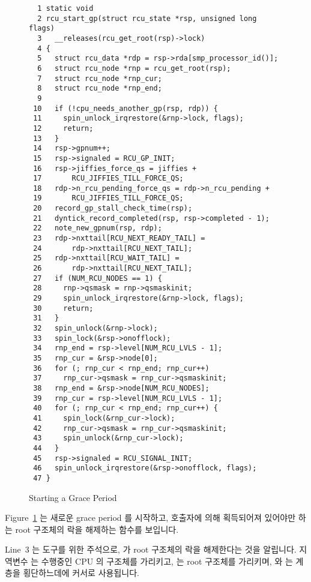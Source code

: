 \begin{figure}[tbp]
{ \scriptsize
\begin{verbatim}
  1 static void
  2 rcu_start_gp(struct rcu_state *rsp, unsigned long flags)
  3   __releases(rcu_get_root(rsp)->lock)
  4 {
  5   struct rcu_data *rdp = rsp->rda[smp_processor_id()];
  6   struct rcu_node *rnp = rcu_get_root(rsp);
  7   struct rcu_node *rnp_cur;
  8   struct rcu_node *rnp_end;
  9
 10   if (!cpu_needs_another_gp(rsp, rdp)) {
 11     spin_unlock_irqrestore(&rnp->lock, flags);
 12     return;
 13   }
 14   rsp->gpnum++;
 15   rsp->signaled = RCU_GP_INIT;
 16   rsp->jiffies_force_qs = jiffies +
 17       RCU_JIFFIES_TILL_FORCE_QS;
 18   rdp->n_rcu_pending_force_qs = rdp->n_rcu_pending +
 19       RCU_JIFFIES_TILL_FORCE_QS;
 20   record_gp_stall_check_time(rsp);
 21   dyntick_record_completed(rsp, rsp->completed - 1);
 22   note_new_gpnum(rsp, rdp);
 23   rdp->nxttail[RCU_NEXT_READY_TAIL] =
 24       rdp->nxttail[RCU_NEXT_TAIL];
 25   rdp->nxttail[RCU_WAIT_TAIL] =
 26       rdp->nxttail[RCU_NEXT_TAIL];
 27   if (NUM_RCU_NODES == 1) {
 28     rnp->qsmask = rnp->qsmaskinit;
 29     spin_unlock_irqrestore(&rnp->lock, flags);
 30     return;
 31   }
 32   spin_unlock(&rnp->lock);
 33   spin_lock(&rsp->onofflock);
 34   rnp_end = rsp->level[NUM_RCU_LVLS - 1];
 35   rnp_cur = &rsp->node[0];
 36   for (; rnp_cur < rnp_end; rnp_cur++)
 37     rnp_cur->qsmask = rnp_cur->qsmaskinit;
 38   rnp_end = &rsp->node[NUM_RCU_NODES];
 39   rnp_cur = rsp->level[NUM_RCU_LVLS - 1];
 40   for (; rnp_cur < rnp_end; rnp_cur++) {
 41     spin_lock(&rnp_cur->lock);
 42     rnp_cur->qsmask = rnp_cur->qsmaskinit;
 43     spin_unlock(&rnp_cur->lock);
 44   }
 45   rsp->signaled = RCU_SIGNAL_INIT;
 46   spin_unlock_irqrestore(&rsp->onofflock, flags);
 47 }
\end{verbatim}
}
\caption{Starting a Grace Period}
\label{fig:app:rcuimpl:rcutreewt:Starting a Grace Period}
\end{figure}

Figure~\ref{fig:app:rcuimpl:rcutreewt:Starting a Grace Period}
는 새로운 grace period 를 시작하고, 호출자에 의해 획득되어져 있어야만 하는 root
 구조체의 락을 해제하는  함수를 보입니다.

Line~3 는  도구를 위한 주석으로,  가 root
 구조체의 락을 해제한다는 것을 알립니다.
지역변수  는 수행중인 CPU 의  구조체를 가리키고, 
는 root  구조체를 가리키며,  와  는
 계층을 횡단하느데에 커서로 사용됩니다.
\iffalse

